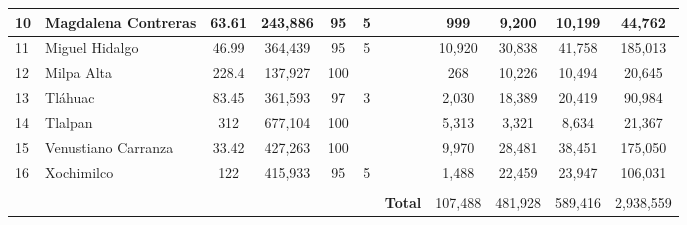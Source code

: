 \begin{landscape}
\begin{table}[]
{\begin{tabular}{llcccllcccc}
\multicolumn{1}{|l|}{10} & \multicolumn{1}{l|}{Magdalena Contreras} & \multicolumn{1}{c|}{63.61} & \multicolumn{1}{c|}{243,886} & \multicolumn{1}{c|}{95} & \multicolumn{1}{c|}{5} & \multicolumn{1}{l|}{} & \multicolumn{1}{c|}{999} & \multicolumn{1}{c|}{9,200} & \multicolumn{1}{c|}{10,199} & \multicolumn{1}{c|}{44,762} \\ \hline
\multicolumn{1}{|l|}{11} & \multicolumn{1}{l|}{Miguel Hidalgo} & \multicolumn{1}{c|}{46.99} & \multicolumn{1}{c|}{364,439} & \multicolumn{1}{c|}{95} & \multicolumn{1}{c|}{5} & \multicolumn{1}{l|}{} & \multicolumn{1}{c|}{10,920} & \multicolumn{1}{c|}{30,838} & \multicolumn{1}{c|}{41,758} & \multicolumn{1}{c|}{185,013} \\ \hline
\multicolumn{1}{|l|}{12} & \multicolumn{1}{l|}{Milpa Alta} & \multicolumn{1}{c|}{228.4} & \multicolumn{1}{c|}{137,927} & \multicolumn{1}{c|}{100} & \multicolumn{1}{l|}{} & \multicolumn{1}{l|}{} & \multicolumn{1}{c|}{268} & \multicolumn{1}{c|}{10,226} & \multicolumn{1}{c|}{10,494} & \multicolumn{1}{c|}{20,645} \\ \hline
\multicolumn{1}{|l|}{13} & \multicolumn{1}{l|}{Tláhuac} & \multicolumn{1}{c|}{83.45} & \multicolumn{1}{c|}{361,593} & \multicolumn{1}{c|}{97} & \multicolumn{1}{c|}{3} & \multicolumn{1}{l|}{} & \multicolumn{1}{c|}{2,030} & \multicolumn{1}{c|}{18,389} & \multicolumn{1}{c|}{20,419} & \multicolumn{1}{c|}{90,984} \\ \hline
\multicolumn{1}{|l|}{14} & \multicolumn{1}{l|}{Tlalpan} & \multicolumn{1}{c|}{312} & \multicolumn{1}{c|}{677,104} & \multicolumn{1}{c|}{100} & \multicolumn{1}{l|}{} & \multicolumn{1}{l|}{} & \multicolumn{1}{c|}{5,313} & \multicolumn{1}{c|}{3,321} & \multicolumn{1}{c|}{8,634} & \multicolumn{1}{c|}{21,367} \\ \hline
\multicolumn{1}{|l|}{15} & \multicolumn{1}{l|}{Venustiano Carranza} & \multicolumn{1}{c|}{33.42} & \multicolumn{1}{c|}{427,263} & \multicolumn{1}{c|}{100} & \multicolumn{1}{l|}{} & \multicolumn{1}{l|}{} & \multicolumn{1}{c|}{9,970} & \multicolumn{1}{c|}{28,481} & \multicolumn{1}{c|}{38,451} & \multicolumn{1}{c|}{175,050} \\ \hline
\multicolumn{1}{|l|}{16} & \multicolumn{1}{l|}{Xochimilco} & \multicolumn{1}{c|}{122} & \multicolumn{1}{c|}{415,933} & \multicolumn{1}{c|}{95} & \multicolumn{1}{c|}{5} & \multicolumn{1}{l|}{} & \multicolumn{1}{c|}{1,488} & \multicolumn{1}{c|}{22,459} & \multicolumn{1}{c|}{23,947} & \multicolumn{1}{c|}{106,031} \\ \hline
 &  & \multicolumn{1}{l}{} & \multicolumn{1}{l}{} & \multicolumn{1}{l}{} &  &  & \multicolumn{1}{l}{} & \multicolumn{1}{l}{} & \multicolumn{1}{l}{} & \multicolumn{1}{l}{} \\ \cline{7-11} 
 &  & \multicolumn{1}{l}{} & \multicolumn{1}{l}{} & \multicolumn{1}{l}{} & \multicolumn{1}{l|}{} & \multicolumn{1}{c|}{\textbf{Total}} & \multicolumn{1}{c|}{107,488} & \multicolumn{1}{c|}{481,928} & \multicolumn{1}{c|}{589,416} & \multicolumn{1}{c|}{2,938,559} \\ \cline{7-11} 
\end{tabular}
}
\end{table}
\end{landscape}

